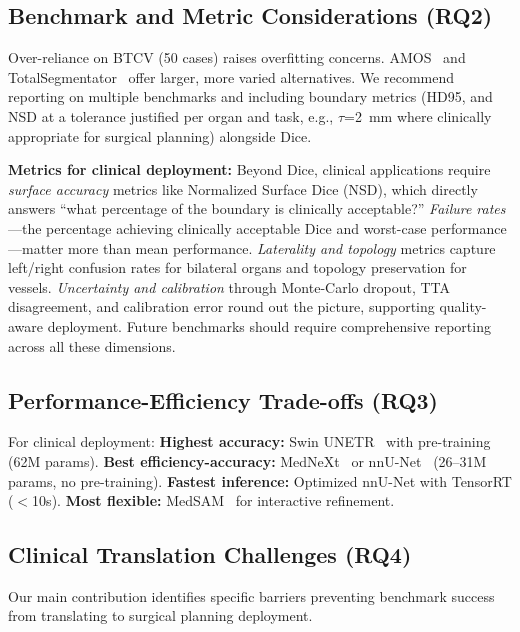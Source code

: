 \subsection{Benchmark and Metric Considerations (RQ2)}

Over-reliance on BTCV (50 cases) raises overfitting concerns. AMOS~\cite{amos2022} and TotalSegmentator~\cite{wasserthal2023totalsegmentator} offer larger, more varied alternatives. We recommend reporting on multiple benchmarks and including boundary metrics (HD95, and NSD at a tolerance justified per organ and task, e.g., $\tau$=2~mm where clinically appropriate for surgical planning) alongside Dice.

\textbf{Metrics for clinical deployment:} Beyond Dice, clinical applications require \emph{surface accuracy} metrics like Normalized Surface Dice (NSD), which directly answers ``what percentage of the boundary is clinically acceptable?'' \emph{Failure rates}---the percentage achieving clinically acceptable Dice and worst-case performance---matter more than mean performance. \emph{Laterality and topology} metrics capture left/right confusion rates for bilateral organs and topology preservation for vessels. \emph{Uncertainty and calibration} through Monte-Carlo dropout, TTA disagreement, and calibration error round out the picture, supporting quality-aware deployment. Future benchmarks should require comprehensive reporting across all these dimensions.

\subsection{Performance-Efficiency Trade-offs (RQ3)}

For clinical deployment: \textbf{Highest accuracy:} Swin UNETR~\cite{swinunetr2022} with pre-training (62M params). \textbf{Best efficiency-accuracy:} MedNeXt~\cite{roy2023mednext} or nnU-Net~\cite{isensee2021nnunet} (26--31M params, no pre-training). \textbf{Fastest inference:} Optimized nnU-Net with TensorRT ($<$10s). \textbf{Most flexible:} MedSAM~\cite{ma2024medsam} for interactive refinement.

\subsection{Clinical Translation Challenges (RQ4)}

Our main contribution identifies specific barriers preventing benchmark success from translating to surgical planning deployment.


